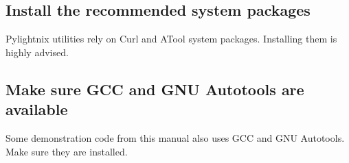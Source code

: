 \subsection{Install the recommended system packages}

Pylightnix utilities rely on Curl and ATool system packages. Installing them
is highly advised.


\subsection{Make sure GCC and GNU Autotools are available}

Some demonstration code from this manual also uses GCC and GNU Autotools. Make
sure they are installed.


